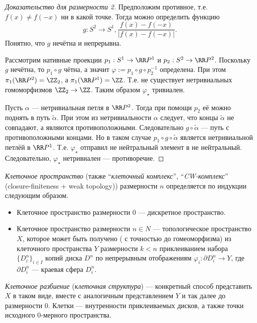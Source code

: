 \documentclass[12pt,a4paper]{article}
\begin{document}
    \begin{proof}[Доказательство для размерности 2]
        Предположим противное, т.е. $f(x) \neq f(-x)$ ни в какой точке. Тогда можно определить функцию
        \[g: S^2 \to S^1, \frac{f(x) - f(-x)}{|f(x) - f(-x)|}.\]
        Понятно, что $g$ нечётна и непрерывна.

        Рассмотрим нативные проекции $p_1: S^1 \to \RR P^1$ и $p_2: S^2 \to \RR P^2$. Поскольку $g$ нечётна, то $p_1 \circ g$ чётна, а значит $\varphi := p_1 \circ g \circ p_2^{-1}$ определена. При этом $\pi_1(\RR P^2) = \ZZ_2$, а $\pi_1(\RR P^1) = \ZZ$. Т.е. не существует нетривиальных гомоморфизмов $\ZZ_2 \to \ZZ$. Таким образом $\varphi_\star$ тривиален.

        Пусть $\alpha$ --- нетривиальная петля в $\RR P^2$. Тогда при помощи $p_2$ её можно поднять в путь $\widetilde{\alpha}$. При этом из нетривиальности $\alpha$ следует, что концы $\widetilde{\alpha}$ не совпадают, а являются противоположными. Следовательно $g \circ \widetilde{\alpha}$ --- путь с противоположными концами. Но в таком случае $p_1 \circ g \circ \widetilde{\alpha}$ является нетривиальной петлёй в $\RR P^1$. Т.е. $\varphi_\star$ отправил не нейтральный элемент в не нейтральный. Следовательно, $\varphi_\star$ нетривиален --- противоречие.
    \end{proof}

    \begin{definition}
        \emph{Клеточное пространство} (также ``\emph{клеточный комплекс}'', ``\emph{CW-комплекс}'' (closure-finiteness + weak topology)) размерности $n$ определяется по индукции следующим образом.
        \begin{itemize}
            \item Клеточное пространство размерности $0$ --- дискретное пространство.
            \item Клеточное пространство размерности $n \in N$ --- топологическое пространство $X$, которое может быть получено ( с точностью до гомеоморфизма) из клеточного пространства $Y$ размерности $k < n$ приклеиванием набора $\{D^n_i\}_{i \in I}$ копий диска $D^n$ по непрерывным отображениям $\varphi_i: \partial D^n_i \to Y$, где $\partial D^n_i$ --- краевая сфера $D^n_i$.
        \end{itemize}

        \emph{Клеточное разбиение} (\emph{клеточная структура}) --- конкретный способ представить $X$ в таком виде, вместе с аналогичным представлением $Y$ и так далее до размерности $0$. Клетки --- внутренности приклеиваемых дисков, а также точки исходного 0-мерного пространства.
    \end{definition}
\end{document}

